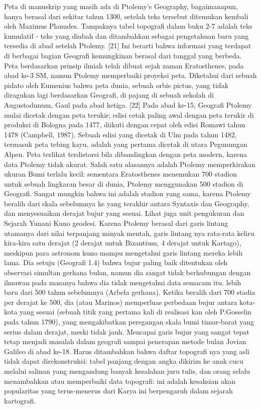 	Peta di manuskrip yang masih ada di Ptolemy's Geography, bagaimanapun, hanya berasal dari sekitar tahun 1300, setelah teks tersebut ditemukan kembali oleh Maximus Planudes. Tampaknya tabel topografi dalam buku 2-7 adalah teks kumulatif - teks yang diubah dan ditambahkan sebagai pengetahuan baru yang tersedia di abad setelah Ptolemy. [21] Ini berarti bahwa informasi yang terdapat di berbagai bagian Geografi kemungkinan berasal dari tanggal yang berbeda. 
	Peta berdasarkan prinsip ilmiah telah dibuat sejak zaman Eratosthenes, pada abad ke-3 SM, namun Ptolemy memperbaiki proyeksi peta. Diketahui dari sebuah pidato oleh Eumenius bahwa peta dunia, sebuah orbis pictus, yang tidak diragukan lagi berdasarkan Geografi, di pajang di sebuah sekolah di Augustodunum, Gaul pada abad ketiga. [22] Pada abad ke-15, Geografi Ptolemy mulai dicetak dengan peta terukir; edisi cetak paling awal dengan peta terukir di produksi di Bologna pada 1477, diikuti dengan cepat oleh edisi Romawi tahun 1478 (Campbell, 1987). Sebuah edisi yang dicetak di Ulm pada tahun 1482, termasuk peta tebing kayu, adalah yang pertama dicetak di utara Pegunungan Alpen. Peta terlihat terdistorsi bila dibandingkan dengan peta modern, karena data Ptolemy tidak akurat. Salah satu alasannya adalah Ptolemy memperkirakan ukuran Bumi terlalu kecil: sementara Eratosthenes menemukan 700 stadion untuk sebuah lingkaran besar di dunia, Ptolemy menggunakan 500 stadion di Geografi. Sangat mungkin bahwa ini adalah stadion yang sama, karena Ptolemy beralih dari skala sebelumnya ke yang terakhir antara Syntaxis dan Geography, dan menyesuaikan derajat bujur yang sesuai. Lihat juga unit pengukuran dan Sejarah Yunani Kuno geodesi.
	Karena Ptolemy berasal dari garis lintang utamanya dari nilai terpanjang minyak mentah, garis lintang nya rata-rata keliru kira-kira satu derajat (2 derajat untuk Bizantium, 4 derajat untuk Kartago), meskipun para astronom kuno mampu mengetahui garis lintang mereka lebih lama. Dia setuju (Geografi 1.4) bahwa bujur paling baik ditentukan oleh observasi simultan gerhana bulan, namun dia sangat tidak berhubungan dengan ilmuwan pada masanya bahwa dia tidak mengetahui data semacam itu. lebih baru dari 500 tahun sebelumnya (Arbela gerhana). Ketika beralih dari 700 stadia per derajat ke 500, dia (atau Marinos) memperluas perbedaan bujur antara kota-kota yang sesuai (sebuah titik yang pertama kali di realisasi kan oleh P.Gosselin pada tahun 1790), yang mengakibatkan peregangan skala bumi timur-barat yang serius dalam derajat, meski tidak jauh. Mencapai garis bujur yang sangat tepat tetap menjadi masalah dalam geografi sampai penerapan metode bulan Jovian Galileo di abad ke-18. Harus ditambahkan bahwa daftar topografi nya yang asli tidak dapat direkonstruksi: tabel panjang dengan angka dikirim ke anak cucu melalui salinan yang mengandung banyak kesalahan juru tulis, dan orang selalu menambahkan atau memperbaiki data topografi: ini adalah kesaksian akan popularitas yang terus-menerus dari Karya ini berpengaruh dalam sejarah kartografi.


